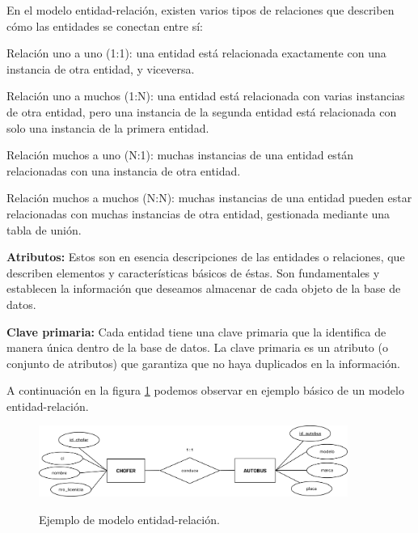 		En el modelo entidad-relación, existen varios tipos de relaciones que describen cómo las entidades se conectan entre sí:
		
		Relación uno a uno (1:1): una entidad está relacionada exactamente con una instancia de otra entidad, y viceversa.
		
		Relación uno a muchos (1:N): una entidad está relacionada con varias instancias de otra entidad, pero una instancia de la segunda entidad está relacionada con solo una instancia de la primera entidad.
		
		Relación muchos a uno (N:1): muchas instancias de una entidad están relacionadas con una instancia de otra entidad.
		
		Relación muchos a muchos (N:N): muchas instancias de una entidad pueden estar relacionadas con muchas instancias de otra entidad, gestionada mediante una tabla de unión.
		
		\textbf{Atributos:} Estos son en esencia descripciones de las entidades o relaciones, que describen elementos y características básicos de éstas. Son fundamentales y establecen la información que deseamos almacenar de cada objeto de la base de datos.
		
		\textbf{Clave primaria:} Cada entidad tiene una clave primaria que la identifica de manera única dentro de la base de datos. La clave primaria es un atributo (o conjunto de atributos) que garantiza que no haya duplicados en la información.
		
		A continuación en la figura \ref{fig:figura2_3} podemos observar en ejemplo básico de un modelo entidad-relación.
		
		\vspace{0.3cm} %
		
		\begin{figure}[h] %
			\caption[Ejemplo MER]
			{\newline Ejemplo de modelo entidad-relación.} %
			\vspace{0.3cm}
			\centering
			\includegraphics[width=0.9\textwidth]{imagenes/figura2_3.png} %
			\vspace{0.3cm}
			\vspace{-0.6cm}
			\label{fig:figura2_3} %
		\end{figure}
	
